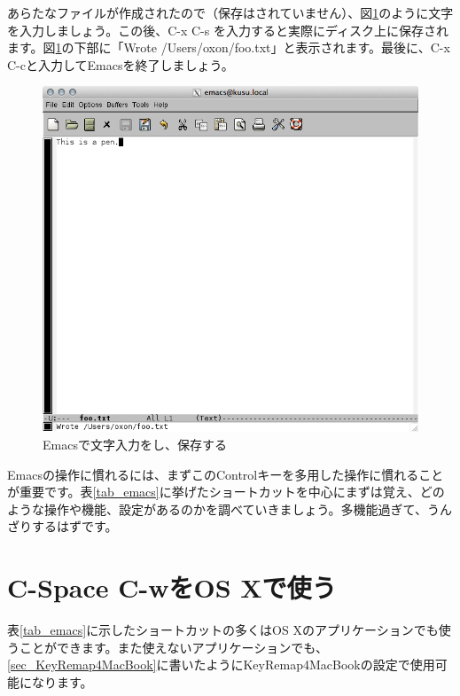 あらたなファイルが作成されたので（保存はされていません）、図\ref{fig_emacs3_png}のように文字を入力しましょう。この後、C-x C-s を入力すると実際にディスク上に保存されます。図\ref{fig_emacs3_png}の下部に「Wrote /Users/oxon/foo.txt」と表示されます。最後に、C-x C-cと入力してEmacsを終了しましょう。

\begin{figure}
  \begin{center}
    \includegraphics[scale=0.35,bb= 0 0 674 620]{fig/emacs3.png}
    \caption{Emacsで文字入力をし、保存する}
    \label{fig_emacs3_png}
  \end{center}
\end{figure}

Emacsの操作に慣れるには、まずこのControlキーを多用した操作に慣れることが重要です。表\ref{tab_emacs}に挙げたショートカットを中心にまずは覚え、どのような操作や機能、設定があるのかを調べていきましょう。多機能過ぎて、うんざりするはずです。

\section{C-Space C-wをOS Xで使う}

表\ref{tab_emacs}に示したショートカットの多くはOS Xのアプリケーションでも使うことができます。また使えないアプリケーションでも、\ref{sec_KeyRemap4MacBook}に書いたようにKeyRemap4MacBookの設定で使用可能になります。

